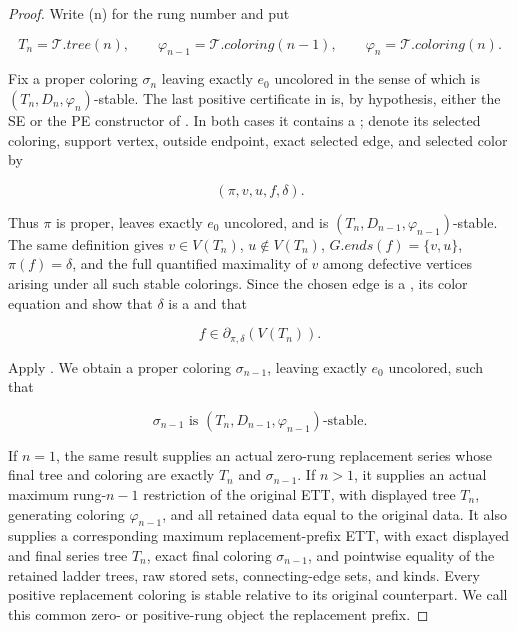 \begin{proof}
Write (n) for the rung number and put

\[
 T_n=\mathcal T.\mathit{tree}(n),\qquad
 \varphi_{n-1}=\mathcal T.\mathit{coloring}(n-1),\qquad
 \varphi_n=\mathcal T.\mathit{coloring}(n).
\]

Fix a proper coloring \(\sigma_n\) leaving exactly \(e_0\) uncolored in
the sense of 
which is \((T_n,D_n,\varphi_n)\)-stable.  The last positive certificate
in  is, by hypothesis, either the SE or the PE
constructor of .  In both cases it contains
a ; denote its selected coloring, support
vertex, outside endpoint, exact selected edge, and selected color by

\[
                   (\pi,v,u,f,\delta).                       \tag{1}
\]

Thus \(\pi\) is proper, leaves exactly \(e_0\) uncolored, and is
\((T_n,D_{n-1},\varphi_{n-1})\)-stable.  The same definition gives
\(v\in V(T_n)\), \(u\notin V(T_n)\),
\(G.\mathit{ends}(f)=\{v,u\}\), \(\pi(f)=\delta\), and the full
quantified maximality of \(v\) among defective vertices arising under
all such stable colorings.  Since the chosen edge is a
, its color equation and
 show that \(\delta\) is a
 and that

\[
                  f\in\partial_{\pi,\delta}(V(T_n)).          \tag{2}
\]

Apply .  We obtain a proper coloring
\(\sigma_{n-1}\), leaving exactly \(e_0\) uncolored, such that

\[
 \sigma_{n-1}\text{ is }(T_n,D_{n-1},\varphi_{n-1})
 \text{-stable}.                                             \tag{3}
\]

If \(n=1\), the same result supplies an actual zero-rung replacement
series whose final tree and coloring are exactly \(T_n\) and
\(\sigma_{n-1}\).  If \(n>1\), it supplies an actual maximum
rung-\(n-1\) restriction of the original ETT, with displayed tree
\(T_n\), generating coloring \(\varphi_{n-1}\), and all retained data
equal to the original data.  It also supplies a corresponding maximum
replacement-prefix ETT, with exact displayed and final series tree
\(T_n\), exact final coloring \(\sigma_{n-1}\), and pointwise equality
of the retained ladder trees, raw stored sets, connecting-edge sets, and
kinds.  Every positive replacement coloring is stable relative to its
original counterpart.  We call this common zero- or positive-rung object
the replacement prefix.


\end{proof}
